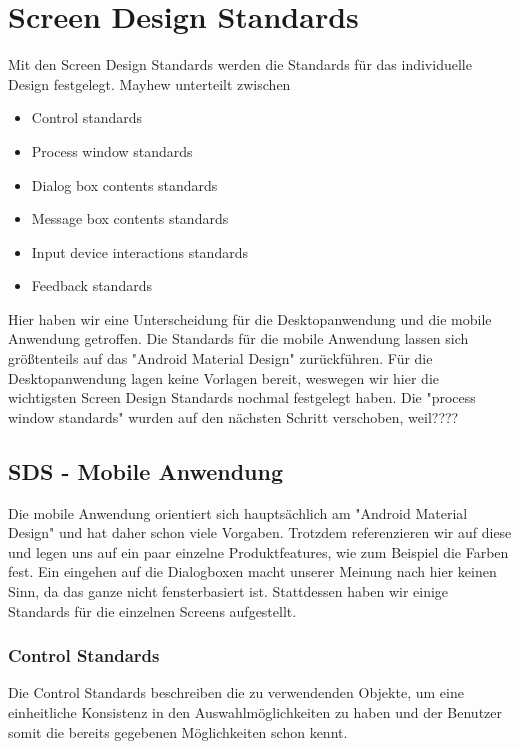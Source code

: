 \chapter{Screen Design Standards}
Mit den Screen Design Standards werden die Standards für das individuelle Design festgelegt. Mayhew unterteilt zwischen
\begin{itemize}
\item Control standards
\item Process window standards
\item Dialog box contents standards
\item Message box contents standards
\item Input device interactions standards 
\item Feedback standards
\end{itemize}

Hier haben wir eine Unterscheidung für die Desktopanwendung und die mobile Anwendung getroffen. Die Standards für die mobile Anwendung lassen sich größtenteils auf das "Android Material Design" zurückführen. Für die Desktopanwendung lagen keine Vorlagen bereit, weswegen wir hier die wichtigsten Screen Design Standards nochmal festgelegt haben. Die "process window standards" wurden auf den nächsten Schritt verschoben, weil????

\section{SDS - Mobile Anwendung}
Die mobile Anwendung orientiert sich hauptsächlich am "Android Material Design" und hat daher schon viele Vorgaben. Trotzdem referenzieren wir auf diese und legen uns auf ein paar einzelne Produktfeatures, wie zum Beispiel die Farben fest. Ein eingehen auf die Dialogboxen macht unserer Meinung nach hier keinen Sinn, da das ganze nicht fensterbasiert ist. Stattdessen haben wir einige Standards für die einzelnen Screens aufgestellt.

\subsection{Control Standards}
Die Control Standards beschreiben die zu verwendenden Objekte, um eine einheitliche Konsistenz in den Auswahlmöglichkeiten zu haben und der Benutzer somit die bereits gegebenen Möglichkeiten schon kennt.

